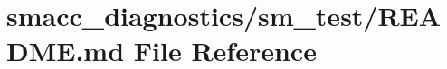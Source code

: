 \hypertarget{smacc__diagnostics_2sm__test_2README_8md}{}\section{smacc\+\_\+diagnostics/sm\+\_\+test/\+R\+E\+A\+D\+ME.md File Reference}
\label{smacc__diagnostics_2sm__test_2README_8md}

